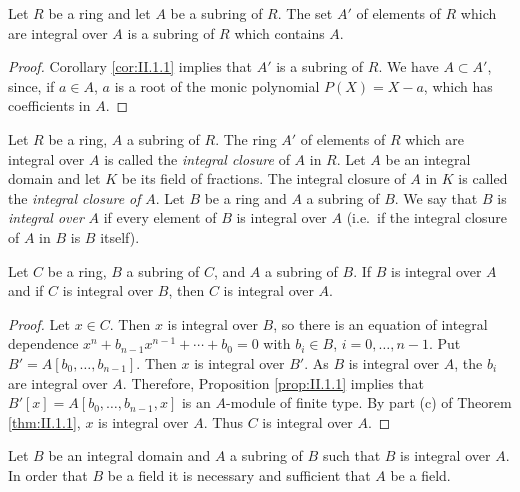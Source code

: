 \begin{corollary}
\label{cor:II.1.2}
Let $R$ be a ring and let $A$ be a subring of $R$. The set $A'$ of elements
of $R$ which are integral over $A$ is a subring of $R$ which contains $A$.
\end{corollary}

\begin{proof}
Corollary \ref{cor:II.1.1} implies that $A'$ is a subring of $R$. We have
$A\subset A'$, since, if $a\in A$, $a$ is a root of the monic polynomial
$P(X)=X-a$, which has coefficients in $A$.
\end{proof}

\begin{definition}\label{def:II.1.2}
Let $R$ be a ring, $A$ a subring of $R$. The ring $A'$ of elements of $R$
which are integral over $A$ is called the \emph{integral closure} of $A$ in
$R$. Let $A$ be an integral domain and let $K$ be its field of fractions. The
integral closure of $A$ in $K$ is called the \emph{integral closure of} $A$.
Let $B$ be a ring and $A$ a subring of $B$. We say that $B$ is
\emph{integral over} $A$ if every element of $B$ is integral over $A$ (i.e.\
if the integral closure of $A$ in $B$ is $B$ itself).
\end{definition}

\begin{proposition}[Transitivity]
\label{prop:II.1.2}
Let $C$ be a ring, $B$ a subring of $C$, and $A$ a subring of $B$. If $B$ is
integral over $A$ and if $C$ is integral over $B$, then $C$ is integral over
$A$.
\end{proposition}

\begin{proof}
Let $x\in C$. Then $x$ is integral over $B$, so there is an equation of
integral dependence $x^{n}+b_{n-1}x^{n-1}+\cdots+b_{0}=0$ with
$b_{i}\in B$, $i=0,\ldots,n-1$. Put $B'=A[b_{0},\ldots,b_{n-1}]$. Then $x$
is integral over $B'$. As $B$ is integral over $A$, the $b_{i}$ are integral
over $A$. Therefore, Proposition \ref{prop:II.1.1} implies that
$B'[x]=A[b_{0},\ldots,b_{n-1},x]$ is an $A$-module of finite type. By part
(c) of Theorem \ref{thm:II.1.1}, $x$ is integral over $A$. Thus $C$ is
integral over $A$.
\end{proof}

\begin{proposition}
\label{prop:II.1.3}
Let $B$ be an integral domain and $A$ a subring of $B$ such that $B$ is
integral over $A$. In order that $B$ be a field it is necessary and
sufficient that $A$ be a field.
\end{proposition}

